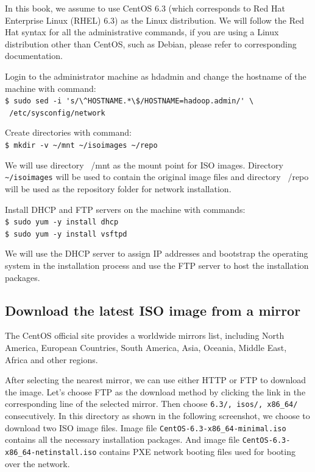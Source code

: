 In this book, we assume to use CentOS 6.3 (which corresponds to Red Hat Enterprise Linux (RHEL) 6.3) as the Linux distribution. We will follow the Red Hat syntax for all the administrative commands, if you are using a Linux distribution other than CentOS, such as Debian, please refer to corresponding documentation.

Login to the administrator machine as hdadmin and change the hostname of the machine with command: \\
\verb|$ sudo sed -i 's/\^HOSTNAME.*\$/HOSTNAME=hadoop.admin/' \| \\
\verb| /etc/sysconfig/network|

Create directories with command: \\
\verb|$ mkdir -v ~/mnt ~/isoimages ~/repo|

We will use directory ~/mnt as the mount point for ISO images. Directory \verb|~/isoimages| will be used to contain the original image files and directory ~/repo will be used as the repository folder for network installation.

Install DHCP and FTP servers on the machine with commands: \\
\verb|$ sudo yum -y install dhcp| \\
\verb|$ sudo yum -y install vsftpd|

We will use the DHCP server to assign IP addresses and bootstrap the operating system in the installation process and use the FTP server to host the installation packages.
\subsection*{Download the latest ISO image from a mirror}
The CentOS official site provides a worldwide mirrors list, including North America, European Countries, South America, Asia, Oceania, Middle East, Africa and other regions.

After selecting the nearest mirror, we can use either HTTP or FTP to download the image. Let's choose FTP as the download method by clicking the link in the corresponding line of the selected mirror. Then choose \verb|6.3/, isos/, x86_64/| consecutively. In this directory as shown in the following screenshot, we choose to download two ISO image files. Image file \verb|CentOS-6.3-x86_64-minimal.iso| contains all the necessary installation packages. And image file \verb|CentOS-6.3-x86_64-netinstall.iso| contains PXE network booting files used for booting over the network.


